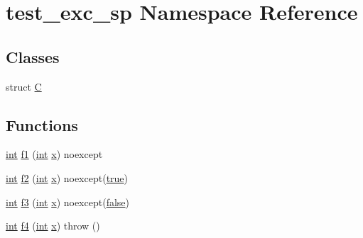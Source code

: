 \hypertarget{namespacetest__exc__sp}{}\section{test\+\_\+exc\+\_\+sp Namespace Reference}
\label{namespacetest__exc__sp}
\subsection*{Classes}
\begin{DoxyCompactItemize}
\item 
struct \mbox{\hyperlink{structtest__exc__sp_1_1_c}{C}}
\end{DoxyCompactItemize}
\subsection*{Functions}
\begin{DoxyCompactItemize}
\item 
\mbox{\hyperlink{warnings_8h_a74f207b5aa4ba51c3a2ad59b219a423b}{int}} \mbox{\hyperlink{namespacetest__exc__sp_a6af51689c0be6ab0a45cfe1c9604340d}{f1}} (\mbox{\hyperlink{warnings_8h_a74f207b5aa4ba51c3a2ad59b219a423b}{int}} \mbox{\hyperlink{_s_d_l__opengl_8h_ad0e63d0edcdbd3d79554076bf309fd47}{x}}) noexcept
\item 
\mbox{\hyperlink{warnings_8h_a74f207b5aa4ba51c3a2ad59b219a423b}{int}} \mbox{\hyperlink{namespacetest__exc__sp_a9bbbfe12c645b1873720e3d8c8284435}{f2}} (\mbox{\hyperlink{warnings_8h_a74f207b5aa4ba51c3a2ad59b219a423b}{int}} \mbox{\hyperlink{_s_d_l__opengl_8h_ad0e63d0edcdbd3d79554076bf309fd47}{x}}) noexcept(\mbox{\hyperlink{asdl_8h_af6a258d8f3ee5206d682d799316314b1a08f175a5505a10b9ed657defeb050e4b}{true}})
\item 
\mbox{\hyperlink{warnings_8h_a74f207b5aa4ba51c3a2ad59b219a423b}{int}} \mbox{\hyperlink{namespacetest__exc__sp_ac8ce741d39a62dff264c82c7e8e2965e}{f3}} (\mbox{\hyperlink{warnings_8h_a74f207b5aa4ba51c3a2ad59b219a423b}{int}} \mbox{\hyperlink{_s_d_l__opengl_8h_ad0e63d0edcdbd3d79554076bf309fd47}{x}}) noexcept(\mbox{\hyperlink{asdl_8h_af6a258d8f3ee5206d682d799316314b1ae9de385ef6fe9bf3360d1038396b884c}{false}})
\item 
\mbox{\hyperlink{warnings_8h_a74f207b5aa4ba51c3a2ad59b219a423b}{int}} \mbox{\hyperlink{namespacetest__exc__sp_a2f82a2da465646031696965355b8f2a3}{f4}} (\mbox{\hyperlink{warnings_8h_a74f207b5aa4ba51c3a2ad59b219a423b}{int}} \mbox{\hyperlink{_s_d_l__opengl_8h_ad0e63d0edcdbd3d79554076bf309fd47}{x}})  throw ()
\end{DoxyCompactItemize}


